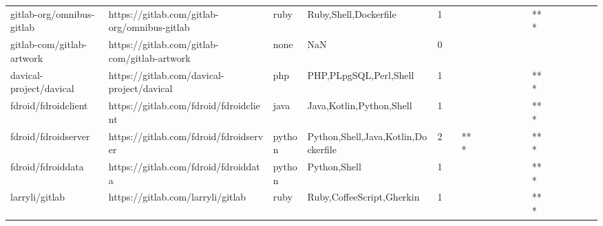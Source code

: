 \begin{tabular}{llllrlllllllllllll}
gitlab-org/omnibus-gitlab                          &       https://gitlab.com/gitlab-org/omnibus-gitlab &              ruby &                              Ruby,Shell,Dockerfile &       1 &         &        &           &                &                 &        &           &       *** &          &          &       &              &          \\
gitlab-com/gitlab-artwork                          &       https://gitlab.com/gitlab-com/gitlab-artwork &              none &                                                NaN &       0 &         &        &           &                &                 &        &           &           &          &          &       &              &          \\
davical-project/davical                            &         https://gitlab.com/davical-project/davical &               php &                             PHP,PLpgSQL,Perl,Shell &       1 &         &        &           &                &                 &        &           &       *** &          &          &       &              &          \\
fdroid/fdroidclient                                &             https://gitlab.com/fdroid/fdroidclient &              java &                           Java,Kotlin,Python,Shell &       1 &         &        &           &                &                 &        &           &       *** &          &          &       &              &          \\
fdroid/fdroidserver                                &             https://gitlab.com/fdroid/fdroidserver &            python &                Python,Shell,Java,Kotlin,Dockerfile &       2 &         &    *** &           &                &                 &        &           &       *** &          &          &       &              &          \\
fdroid/fdroiddata                                  &               https://gitlab.com/fdroid/fdroiddata &            python &                                       Python,Shell &       1 &         &        &           &                &                 &        &           &       *** &          &          &       &              &          \\
larryli/gitlab                                     &                  https://gitlab.com/larryli/gitlab &              ruby &                          Ruby,CoffeeScript,Gherkin &       1 &         &        &           &                &                 &        &           &       *** &          &          &       &              &          \\

\end{tabular}
